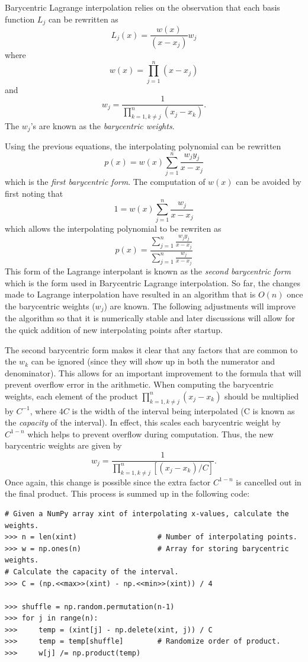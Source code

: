 Barycentric Lagrange interpolation relies on the observation that each basis function $L_j$ can be rewritten as
\[
L_j(x) = \frac{w(x)}{(x-x_j)}w_j
\]
where
\[
w(x) = \prod_{j=1}^n (x-x_j)
\]
and
\[
w_j = \frac{1}{\prod_{k=1, k \neq j}^n (x_j-x_k)}.
\]
The $w_j$'s are known as the \emph{barycentric weights}.

Using the previous equations, the interpolating polynomial can be rewritten
\[
p(x) = w(x) \sum_{j=1}^n \frac{w_j y_j}{x-x_j}
\]
which is the \emph{first barycentric form}.
The computation of $w(x)$ can be avoided by first noting that
\[
1 = w(x) \sum_{j=1}^n \frac{w_j}{x-x_j}
\]
which allows the interpolating polynomial to be rewriten as
\[
p(x) = \frac{\displaystyle\sum_{j=1}^n \frac{w_j y_j}{x-x_j}}{\displaystyle\sum_{j=1}^n \frac{w_j}{x-x_j}}
\]
This form of the Lagrange interpolant is known as the \emph{second barycentric form} which is the form used in Barycentric Lagrange interpolation.
So far, the changes made to Lagrange interpolation have resulted in an algorithm that is $O(n)$ once the barycentric weights ($w_j$) are known.
The following adjustments will improve the algorithm so that it is numerically stable and later discussions will allow for the quick addition of new interpolating points after startup.

The second barycentric form makes it clear that any factors that are common to the $w_k$ can be ignored (since they will show up in both the numerator and denominator).
This allows for an important improvement to the formula that will prevent overflow error in the arithmetic.
When computing the barycentric weights, each element of the product $\prod_{k=1, k \neq j}^n (x_j-x_k)$ should be multiplied by $C^{-1}$, where $4C$ is the width of the interval being interpolated
(C is known as the \emph{capacity} of the interval).
In effect, this scales each barycentric weight by $C^{1-n}$ which helps to prevent overflow during computation.
Thus, the new barycentric weights are given by
\[
w_j = \frac{1}{\prod_{k=1, k \neq j}^n \left[(x_j-x_k) / C\right]}.
\]
Once again, this change is possible since the extra factor $C^{1-n}$ is cancelled out in the final product.
This process is summed up in the following code:

\begin{lstlisting}
# Given a NumPy array xint of interpolating x-values, calculate the weights.
>>> n = len(xint)                   # Number of interpolating points.
>>> w = np.ones(n)                  # Array for storing barycentric weights.
# Calculate the capacity of the interval.
>>> C = (np.<<max>>(xint) - np.<<min>>(xint)) / 4

>>> shuffle = np.random.permutation(n-1)
>>> for j in range(n):
>>>     temp = (xint[j] - np.delete(xint, j)) / C
>>>     temp = temp[shuffle]        # Randomize order of product.
>>>     w[j] /= np.product(temp)
\end{lstlisting}

